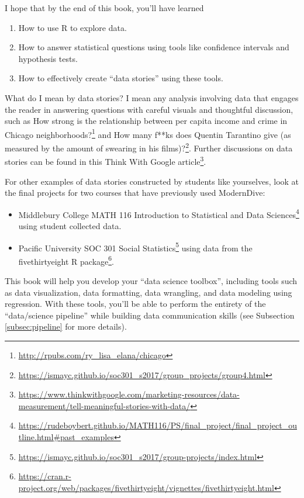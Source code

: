 \documentclass[
  12pt, krantz2,
]{krantz}
\providecommand{\tightlist}{%
  \setlength{\itemsep}{0pt}\setlength{\parskip}{0pt}}
\renewcommand{\href}[2]{#2\footnote{\url{#1}}}
\begin{document}
I hope that by the end of this book, you'll have learned

\begin{enumerate}
\def\labelenumi{\arabic{enumi}.}
\tightlist
\item
  How to use R to explore data.\\
\item
  How to answer statistical questions using tools like confidence intervals and hypothesis tests.
\item
  How to effectively create ``data stories'' using these tools.
\end{enumerate}

What do I mean by data stories? I mean any analysis involving data that engages the reader in answering questions with careful visuals and thoughtful discussion, such as \href{http://rpubs.com/ry_lisa_elana/chicago}{How strong is the relationship between per capita income and crime in Chicago neighborhoods?} and \href{https://ismayc.github.io/soc301_s2017/group_projects/group4.html}{How many f**ks does Quentin Tarantino give (as measured by the amount of swearing in his films)?}. Further discussions on data stories can be found in this \href{https://www.thinkwithgoogle.com/marketing-resources/data-measurement/tell-meaningful-stories-with-data/}{Think With Google article}.

For other examples of data stories constructed by students like yourselves, look at the final projects for two courses that have previously used ModernDive:

\begin{itemize}
\tightlist
\item
  Middlebury College \href{https://rudeboybert.github.io/MATH116/PS/final_project/final_project_outline.html\#past_examples}{MATH 116 Introduction to Statistical and Data Sciences} using student collected data.
\item
  Pacific University \href{https://ismayc.github.io/soc301_s2017/group-projects/index.html}{SOC 301 Social Statistics} using data from the \href{https://cran.r-project.org/web/packages/fivethirtyeight/vignettes/fivethirtyeight.html}{fivethirtyeight R package}.
\end{itemize}

This book will help you develop your ``data science toolbox'', including tools such as data visualization, data formatting, data wrangling, and data modeling using regression. With these tools, you'll be able to perform the entirety of the ``data/science pipeline'' while building data communication skills (see Subsection \ref{subsec:pipeline} for more details).
\end{document}
